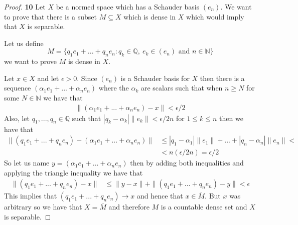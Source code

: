 \documentclass[11pt]{article}
\newcommand{\N}{\mathbb{N}}
\newcommand{\Q}{\mathbb{Q}}
\theoremstyle{definition}
\begin{document}
\begin{proof}{\textbf{10}}
    Let $X$ be a normed space which has a Schauder basis $(e_n)$.
    We want to prove that there is a subset $M \subseteq X$ which is dense in
    $X$ which would imply that $X$ is separable.

    Let us define
    $$M = \{q_1e_1 + ... + q_n e_n: q_k \in \Q,~ 
    e_k\in (e_n) \text{ and }n\in\N\}$$
    we want to prove $M$ is dense in $X$.

    Let $x \in X$ and let $\epsilon > 0$.
    Since $(e_n)$ is a Schauder basis for $X$ then there is a sequence
    $(\alpha_1e_1 + ... + \alpha_n e_n)$
    where the $\alpha_k$ are scalars such that when $n \geq N$ for some
    $N \in \N$ we have that 
    \begin{align*}
        \|(\alpha_1e_1 + ... + \alpha_n e_n)- x\| < \epsilon/2
    \end{align*}
    Also, let $q_1, ..., q_n \in \Q$ such that
    $|q_k - \alpha_k|\|e_k\|< \epsilon /2n$
    for $1 \leq  k \leq n$ then we have that
    \begin{align*}
        \|(q_1e_1 + ... + q_n e_n) - (\alpha_1e_1 + ... +\alpha_ne_n)\| &\leq
        |q_1 - \alpha_1|\|e_1\| + ...+ |q_n - \alpha_n|\|e_n\| <\\
        &< n (\epsilon / 2n) = \epsilon/2
    \end{align*}
    So let us name $y = (\alpha_1e_1 + ... + \alpha_n e_n)$ then by adding both
    inequalities and applying the triangle inequality
    we have that
    \begin{align*}
        \|(q_1e_1 + ... + q_n e_n) - x\| &\leq
        \|y- x\| + \|(q_1e_1 + ... + q_n e_n) - y\| < \epsilon
    \end{align*}
    This implies that $(q_1e_1 + ... + q_n e_n) \to x$ and hence
    that $x \in \overline{M}$. But $x$ was arbitrary so we have that
    $X = \overline{M}$ and therefore $M$ is a countable dense set
    and $X$ is separable.

\end{proof}
\cleardoublepage
\end{document}
